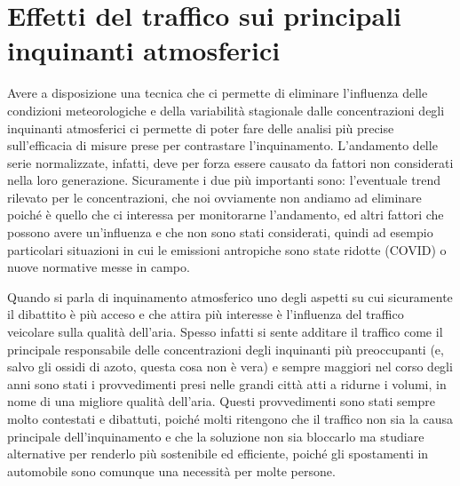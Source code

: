 \documentclass[a4paper]{report}
\begin{document}
 

\chapter{Effetti del traffico sui principali inquinanti atmosferici}
Avere a disposizione una tecnica che ci permette di eliminare l'influenza delle condizioni meteorologiche e della variabilità stagionale dalle concentrazioni degli inquinanti atmosferici ci permette di poter fare delle analisi più precise sull'efficacia di misure prese per contrastare l'inquinamento. L'andamento delle serie normalizzate, infatti, deve per forza essere causato da fattori non considerati nella loro generazione. Sicuramente i due più importanti sono: l'eventuale trend rilevato per le concentrazioni, che noi ovviamente non andiamo ad eliminare poiché è quello che ci interessa per monitorarne l'andamento, ed altri fattori che possono avere un'influenza e che non sono stati considerati, quindi ad esempio particolari situazioni in cui le emissioni antropiche sono state ridotte (COVID) o nuove normative messe in campo.

Quando si parla di inquinamento atmosferico uno degli aspetti su cui sicuramente il dibattito è più acceso e che attira più interesse è l'influenza del traffico veicolare sulla qualità dell'aria. Spesso infatti si sente additare il traffico come il principale responsabile delle concentrazioni degli inquinanti più preoccupanti (e, salvo gli ossidi di azoto, questa cosa non è vera) e sempre maggiori nel corso degli anni sono stati i provvedimenti presi nelle grandi città atti a ridurne i volumi, in nome di una migliore qualità dell'aria. Questi provvedimenti sono stati sempre molto contestati e dibattuti, poiché molti ritengono che il traffico non sia la causa principale dell'inquinamento e che la soluzione non sia bloccarlo ma studiare alternative per renderlo più sostenibile ed efficiente, poiché gli spostamenti in automobile sono comunque una necessità per molte persone.
\end{document}
